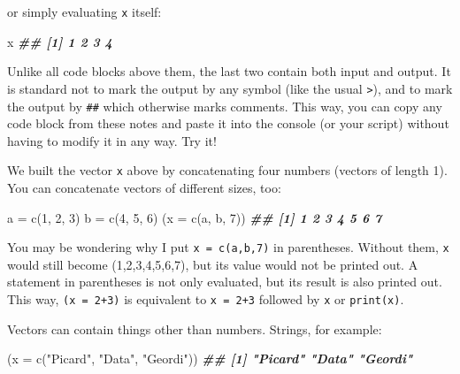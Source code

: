\documentclass[
]{book}
\newenvironment{Shaded}{\begin{snugshade}}{\end{snugshade}}
\newcommand{\AttributeTok}[1]{\textcolor[rgb]{0.77,0.63,0.00}{#1}}
\newcommand{\DecValTok}[1]{\textcolor[rgb]{0.00,0.00,0.81}{#1}}
\newcommand{\DocumentationTok}[1]{\textcolor[rgb]{0.56,0.35,0.01}{\textbf{\textit{#1}}}}
\newcommand{\FunctionTok}[1]{\textcolor[rgb]{0.00,0.00,0.00}{#1}}
\newcommand{\NormalTok}[1]{#1}
\newcommand{\OtherTok}[1]{\textcolor[rgb]{0.56,0.35,0.01}{#1}}
\newcommand{\StringTok}[1]{\textcolor[rgb]{0.31,0.60,0.02}{#1}}
\theoremstyle{definition}
\theoremstyle{definition}
\theoremstyle{definition}
\theoremstyle{definition}
\theoremstyle{remark}
\begin{document}
or simply evaluating \texttt{x} itself:

\begin{Shaded}
\begin{Highlighting}[]
\NormalTok{x}
\DocumentationTok{\#\# [1] 1 2 3 4}
\end{Highlighting}
\end{Shaded}

Unlike all code blocks above them, the last two contain both input and output. It is standard not to mark the output by any symbol (like the usual \texttt{\textgreater{}}), and to mark the output by \texttt{\#\#} which otherwise marks comments. This way, you can copy any code block from these notes and paste it into the console (or your script) without having to modify it in any way. Try it!

We built the vector \texttt{x} above by concatenating four numbers (vectors of length 1). You can concatenate vectors of different sizes, too:

\begin{Shaded}
\begin{Highlighting}[]
\NormalTok{a }\OtherTok{=} \FunctionTok{c}\NormalTok{(}\DecValTok{1}\NormalTok{, }\DecValTok{2}\NormalTok{, }\DecValTok{3}\NormalTok{)}
\NormalTok{b }\OtherTok{=} \FunctionTok{c}\NormalTok{(}\DecValTok{4}\NormalTok{, }\DecValTok{5}\NormalTok{, }\DecValTok{6}\NormalTok{)}
\NormalTok{(}\AttributeTok{x =} \FunctionTok{c}\NormalTok{(a, b, }\DecValTok{7}\NormalTok{))}
\DocumentationTok{\#\# [1] 1 2 3 4 5 6 7}
\end{Highlighting}
\end{Shaded}

You may be wondering why I put \texttt{x\ =\ c(a,b,7)} in parentheses. Without them, \texttt{x} would still become (1,2,3,4,5,6,7), but its value would not be printed out. A statement in parentheses is not only evaluated, but its result is also printed out. This way, \texttt{(x\ =\ 2+3)} is equivalent to \texttt{x\ =\ 2+3} followed by \texttt{x} or \texttt{print(x)}.

Vectors can contain things other than numbers. Strings, for example:

\begin{Shaded}
\begin{Highlighting}[]
\NormalTok{(}\AttributeTok{x =} \FunctionTok{c}\NormalTok{(}\StringTok{"Picard"}\NormalTok{, }\StringTok{"Data"}\NormalTok{, }\StringTok{"Geordi"}\NormalTok{))}
\DocumentationTok{\#\# [1] "Picard" "Data"   "Geordi"}
\end{Highlighting}
\end{Shaded}
\end{document}
